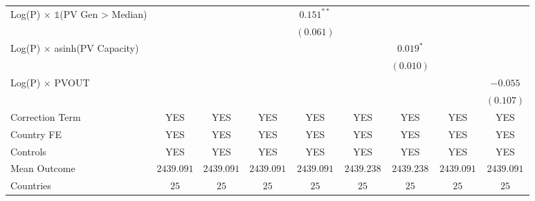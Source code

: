 \begin{table}[htbp]
\begin{center}
\begin{tabular}{l c c c c c c c c}
Log(P) $\times$ $\mathds{1}$(PV Gen > Median)             &                &                &                & $0.151^{**}$   &                &                &                &               \\
                                                          &                &                &                & $(0.061)$      &                &                &                &               \\
Log(P) $\times$ asinh(PV Capacity)                        &                &                &                &                &                & $0.019^{*}$    &                &               \\
                                                          &                &                &                &                &                & $(0.010)$      &                &               \\
Log(P) $\times$ PVOUT                                     &                &                &                &                &                &                &                & $-0.055$      \\
                                                          &                &                &                &                &                &                &                & $(0.107)$     \\
\hline
Correction Term                                           & YES            & YES            & YES            & YES            & YES            & YES            & YES            & YES           \\
Country FE                                                & YES            & YES            & YES            & YES            & YES            & YES            & YES            & YES           \\
Controls                                                  & YES            & YES            & YES            & YES            & YES            & YES            & YES            & YES           \\
Mean Outcome                                              & $2439.091$     & $2439.091$     & $2439.091$     & $2439.091$     & $2439.238$     & $2439.238$     & $2439.091$     & $2439.091$    \\
Countries                                                 & $25$           & $25$           & $25$           & $25$           & $25$           & $25$           & $25$           & $25$          \\

\end{tabular}
\end{center}
\end{table}
